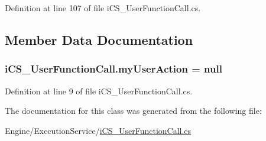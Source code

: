 Definition at line 107 of file i\+C\+S\+\_\+\+User\+Function\+Call.\+cs.



\subsection{Member Data Documentation}
\hypertarget{classi_c_s___user_function_call_ad1d01131ea4379284d42b209f7833d0f}{
\subsubsection[{my\+User\+Action}]{ i\+C\+S\+\_\+\+User\+Function\+Call.\+my\+User\+Action = null\hspace{0.3cm}{\ttfamily [protected]}}}\label{classi_c_s___user_function_call_ad1d01131ea4379284d42b209f7833d0f}


Definition at line 9 of file i\+C\+S\+\_\+\+User\+Function\+Call.\+cs.



The documentation for this class was generated from the following file\+:\begin{DoxyCompactItemize}
\item 
Engine/\+Execution\+Service/\hyperlink{i_c_s___user_function_call_8cs}{i\+C\+S\+\_\+\+User\+Function\+Call.\+cs}\end{DoxyCompactItemize}
